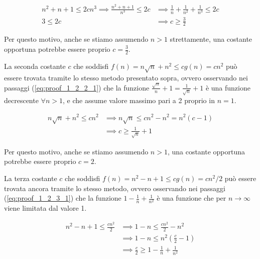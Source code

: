 \documentclass{article}
\begin{document}
\begin{equation} \label{eq:proof_1_2_1_1}
\begin{aligned}
n^2 + n + 1 \le 2cn^3 \implies \frac{n^2 + n +1}{n^3} \le 2c &\implies \frac{1}{n} + \frac{1}{n^2} + \frac{1}{n^3} \le 2c \\
3 \le 2c &\implies c \ge \frac{3}{2}
\end{aligned}
\end{equation}

\noindent
Per questo motivo, anche se stiamo assumendo $n>1$ strettamente, una costante opportuna potrebbe essere proprio $c = \frac{3}{2}$.

\vspace{\baselineskip}
\noindent
La seconda costante $c$ che soddisfi $f(n) = n\sqrt{n} + n^2 \le cg(n) = cn^2 $ può essere trovata tramite lo stesso metodo presentato sopra, ovvero osservando nei passaggi (\ref{eq:proof_1_2_2_1}) che la funzione $\frac{\sqrt{n}}{n} + 1 = \frac{1}{\sqrt{n}} + 1 $ è una funzione decrescente $\forall n > 1$, e che assume valore massimo pari a 2 proprio in $n=1$.

\begin{equation} \label{eq:proof_1_2_2_1}
\begin{aligned}
n\sqrt{n} + n^2 \le cn^2 &\implies n\sqrt{n} \le cn^2 - n^2 = n^2 (c-1) \\
&\implies c \ge \frac{1}{\sqrt{n}} + 1
\end{aligned}
\end{equation}

\noindent
Per questo motivo, anche se stiamo assumendo $n>1$, una costante opportuna potrebbe essere proprio $c = 2$.

\vspace{\baselineskip}
\noindent
La terza costante $c$ che soddisfi $ f(n) = n^2 - n + 1 \le cg(n) = cn^2/2 $ può essere trovata ancora tramite lo stesso metodo, ovvero osservando nei passaggi (\ref{eq:proof_1_2_3_1}) che la funzione $1-\frac{1}{n} + \frac{1}{n^2} $ è una funzione che per $n \rightarrow \infty $ viene limitata dal valore 1.

\begin{equation} \label{eq:proof_1_2_3_1}
\begin{aligned}
n^2 - n + 1 \le \frac{cn^2}{2} &\implies 1 - n \le \frac{cn^2}{2} - n^2 \\
&\implies 1 - n \le n^2 (\frac{c}{2} -1) \\
&\implies \frac{c}{2} \ge 1 - \frac{1}{n} + \frac{1}{n^2} \\
\end{aligned}
\end{equation}
\end{document}
